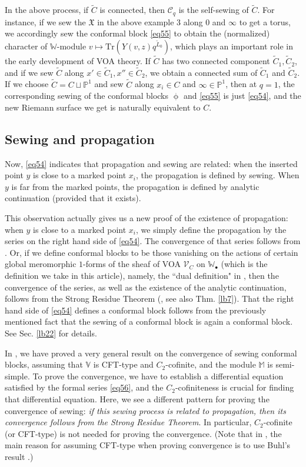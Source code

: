 \documentclass[12pt,a4paper,notitlepage]{article}
\theoremstyle{definition}
\theoremstyle{plain}
\newcommand{\fk}{\mathfrak}
\newcommand{\mc}{\mathcal}
\newcommand{\wtd}{\widetilde}
\newcommand{\Tr}{\mathrm{Tr}}
\newcommand{\scr}{\mathscr}
\newcommand{\blt}{\bullet}
\newcommand{\Vbb}{\mathbb V}
\newcommand{\Wbb}{\mathbb W}
\newcommand{\Mbb}{\mathbb M}
\newcommand{\Pbb}{\mathbb P}
\numberwithin{equation}{section}
\begin{document}
In the above process, if $\wtd C$ is connected, then $\mc C_q$ is the self-sewing of $\wtd C$. For instance, if we sew the  $\fk X$ in the above example 3 along $0$ and $\infty$ to get a torus, we accordingly sew the conformal block \eqref{eq55} to obtain the (normalized) character of $\Wbb$-module $v\mapsto \Tr (Y(v,z)q^{\wtd L_0})$, which plays an important role in the early development of VOA theory. If $\wtd C$ has two connected component $\wtd C_1,\wtd C_2$, and if we sew $\wtd C$ along $x'\in\wtd C_1,x''\in\wtd C_2$, we obtain a connected sum of $\wtd C_1$ and $\wtd C_2$. If we choose $\wtd C=C\sqcup\Pbb^1$ and sew $\wtd C$ along $x_i\in C$ and $\infty\in\Pbb^1$, then at $q=1$, the corresponding sewing of the conformal blocks $\upphi$ and \eqref{eq55} is just \eqref{eq54}, and the new Riemann surface we get is naturally equivalent to $C$.



\subsection*{Sewing and propagation}

Now,  \eqref{eq54} indicates that propagation and sewing are related: when the inserted point $y$ is close to a marked point $x_i$, the propagation is defined by sewing. When $y$ is far from the marked points, the propagation is defined by analytic continuation (provided that it exists). 

This observation actually gives us a new proof of the existence of propagation: when $y$ is close to a marked point $x_i$, we simply define the propagation by the series on the right hand side of \eqref{eq54}. The convergence of that series follows from \cite[10.1.1]{FB04}. Or, if we define conformal blocks to be those vanishing on the actions of certain global meromorphic $1$-forms of the sheaf of VOA $\scr V_C$ on $\Wbb_\blt$ (which is the definition we take in this article), namely, the ``dual definition" in \cite[10.1.2]{FB04}, then the convergence of the series, as well as the existence of the analytic continuation, follows from the Strong Residue Theorem (\cite[9.2.9]{FB04}, see also Thm. \ref{lb7}). That the right hand side of \eqref{eq54} defines a conformal block follows from the previously mentioned fact that the sewing of a conformal block is again a conformal block. See Sec. \ref{lb22} for details.


In \cite{Gui20}, we have proved a very general result on the convergence of sewing conformal blocks, assuming that $\Vbb$ is CFT-type and $C_2$-cofinite, and the module $\Mbb$ is semi-simple. To prove the convergence, we have to establish a differential equation satisfied by the formal series  \eqref{eq56}, and the $C_2$-cofiniteness is crucial for finding that differential equation. Here, we see a different pattern for proving the convergence of sewing: \textit{if this sewing process is related to propagation, then its convergence follows from the Strong Residue Theorem}. In particular, $C_2$-cofinite (or CFT-type) is not needed for proving the convergence. (Note that in \cite{Gui20}, the main reason for assuming CFT-type when proving convergence is to use Buhl's result \cite{Buhl02}.)
\end{document}
